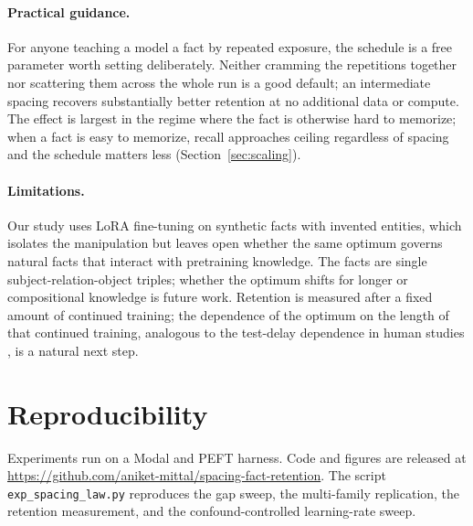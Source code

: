 \documentclass[10pt]{article}
\begin{document}
\paragraph{Practical guidance.} For anyone teaching a model a fact by repeated exposure, the
schedule is a free parameter worth setting deliberately. Neither cramming the repetitions together
nor scattering them across the whole run is a good default; an intermediate spacing recovers
substantially better retention at no additional data or compute. The effect is largest in the
regime where the fact is otherwise hard to memorize; when a fact is easy to memorize, recall
approaches ceiling regardless of spacing and the schedule matters less (Section~\ref{sec:scaling}).

\paragraph{Limitations.} Our study uses LoRA fine-tuning on synthetic facts with invented entities,
which isolates the manipulation but leaves open whether the same optimum governs natural facts that
interact with pretraining knowledge. The facts are single subject-relation-object triples; whether
the optimum shifts for longer or compositional knowledge is future work. Retention is measured
after a fixed amount of continued training; the dependence of the optimum on the length of that
continued training, analogous to the test-delay dependence in human studies
\citep{cepeda2008spacing}, is a natural next step.

\section*{Reproducibility}
Experiments run on a Modal and PEFT harness. Code and figures are released at
\url{https://github.com/aniket-mittal/spacing-fact-retention}. The script
\texttt{exp\_spacing\_law.py} reproduces the gap sweep, the multi-family replication, the retention
measurement, and the confound-controlled learning-rate sweep.
\end{document}

